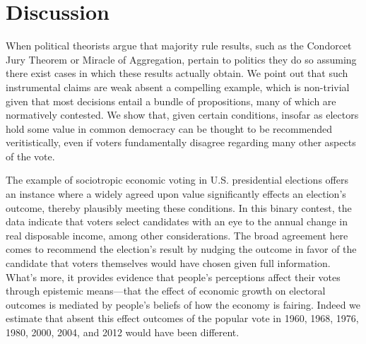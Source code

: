 \documentclass[11pt]{article}
\begin{document}
\section{Discussion}

When political  theorists argue that majority rule results, such as the Condorcet Jury Theorem or Miracle of Aggregation, pertain to politics they do so assuming there exist cases in which these results actually obtain. We point out that such instrumental claims are weak absent a compelling example, which is non-trivial given that most decisions entail a bundle of propositions, many of which are normatively contested. We show that, given certain conditions, insofar as electors hold some value in common democracy can be thought to be recommended veritistically, even if voters fundamentally disagree regarding many other aspects of the vote.

The example of sociotropic economic voting in U.S. presidential elections offers an instance where a widely agreed upon value significantly effects an election's outcome, thereby plausibly meeting these conditions. In this binary contest, the data indicate that voters select candidates with an eye to the annual change in real disposable income, among other considerations. The broad agreement here comes to recommend the election's result by nudging the outcome in favor of the candidate that voters themselves would have chosen given full information. What's more, it provides evidence that people's perceptions affect their votes through epistemic means---that the effect of economic growth on electoral outcomes is mediated by people's beliefs of how the economy is fairing. Indeed we estimate that absent this effect outcomes of the popular vote in 1960, 1968, 1976, 1980, 2000, 2004, and 2012 would have been different. 
\end{document}
